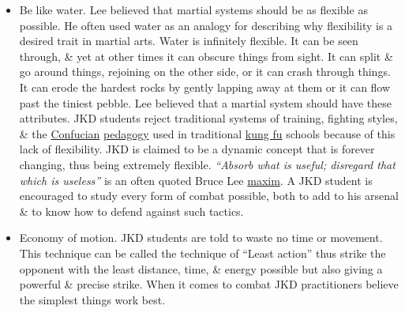 \documentclass{article}
\begin{document}
\begin{itemize}
	\item {\sf Be like water.} {\sc Lee} believed that martial systems should be as flexible as possible. He often used water as an analogy for describing why flexibility is a desired trait in martial arts. Water is infinitely flexible. It can be seen through, \& yet at other times it can obscure things from sight. It can split \& go around things, rejoining on the other side, or it can crash through things. It can erode the hardest rocks by gently lapping away at them or it can flow past the tiniest pebble. {\sc Lee} believed that a martial system should have these attributes. JKD students reject traditional systems of training, fighting styles, \& the \href{https://en.wikipedia.org/wiki/Confucian}{Confucian} \href{https://en.wikipedia.org/wiki/Pedagogy}{pedagogy} used in traditional \href{https://en.wikipedia.org/wiki/Kung_fu}{kung fu} schools because of this lack of flexibility. JKD is claimed to be a dynamic concept that is forever changing, thus being extremely flexible. {\it``Absorb what is useful; disregard that which is useless''} is an often quoted {\sc Bruce Lee} \href{https://en.wikipedia.org/wiki/Maxim_(saying)}{maxim}. A JKD student is encouraged to study every form of combat possible, both to add to his arsenal \& to know how to defend against such tactics.

	\item {\sf Economy of motion.} JKD students are told to waste no time or movement. This technique can be called the technique of ``Least action'' thus strike the opponent with the least distance, time, \& energy possible but also giving a powerful \& precise strike. When it comes to combat JKD practitioners believe the simplest things work best.


\end{itemize}
\end{document}
